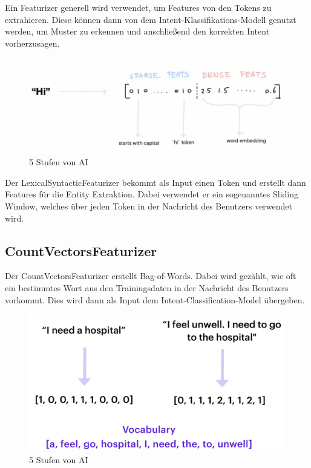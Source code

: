 Ein Featurizer generell wird verwendet, um Features von den Tokens zu extrahieren.
Diese können dann von dem Intent-Klassifikations-Modell genutzt werden, um Muster zu erkennen und anschließend den korrekten Intent vorherzusagen.\cite{lexicalSyntacticFeaturizer, pipelineComponentsYoutube, pipelineConfigurationVideo}

\begin{figure}[hbt!]
  \centering
  \includegraphics[scale=0.25]{pics/featurizer}
  \caption{5 Stufen von AI~\cite{pipelineConfigurationVideo}}
  \label{fig:Featurizer}
\end{figure}

Der LexicalSyntacticFeaturizer bekommt als Input einen Token und erstellt dann Features für die Entity Extraktion.
Dabei verwendet er ein sogenanntes Sliding Window, welches über jeden Token in der Nachricht des Benutzers verwendet wird.\cite{lexicalSyntacticFeaturizer, pipelineComponentsYoutube, pipelineConfigurationVideo}

\subsection{CountVectorsFeaturizer}

Der CountVectorsFeaturizer erstellt Bag-of-Words.
Dabei wird gezählt, wie oft ein bestimmtes Wort aus den Trainingsdaten in der Nachricht des Benutzers vorkommt.
Dies wird dann als Input dem Intent-Classification-Model übergeben.\cite{countVectorsFeaturizer, pipelineConfigurationVideo, pipelineComponentsYoutube, rasaMasterclassCountVectorsFeaturizer}

\begin{figure}[hbt!]
  \centering
  \includegraphics[scale=0.25]{pics/countvectorsfeaturizer}
  \caption{5 Stufen von AI~\cite{pipelineConfigurationVideo}}
  \label{fig:CountVectorsFeaturizer}
\end{figure}

